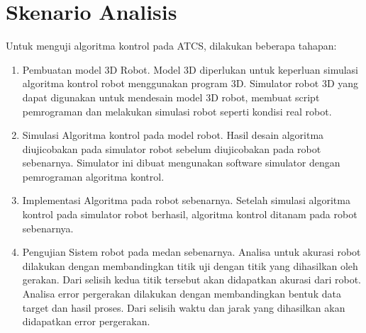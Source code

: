 \section{Skenario Analisis}

Untuk menguji algoritma kontrol pada ATCS, dilakukan beberapa tahapan:

\begin{enumerate}
	\item Pembuatan model 3D Robot. Model 3D diperlukan untuk keperluan simulasi algoritma kontrol robot menggunakan program 3D. Simulator robot 3D yang dapat digunakan untuk mendesain model 3D robot, membuat script pemrograman dan melakukan simulasi robot seperti kondisi real robot.

\item Simulasi Algoritma kontrol pada model robot. Hasil desain algoritma diujicobakan pada simulator robot sebelum diujicobakan pada robot sebenarnya. Simulator ini dibuat mengunakan software simulator dengan pemrograman algoritma kontrol.

\item Implementasi Algoritma pada robot sebenarnya. Setelah simulasi algoritma kontrol pada simulator robot berhasil, algoritma kontrol ditanam pada robot sebenarnya.
\item Pengujian Sistem robot pada medan sebenarnya. Analisa untuk akurasi robot dilakukan dengan membandingkan titik uji dengan titik yang dihasilkan oleh gerakan. Dari selisih kedua titik tersebut akan didapatkan akurasi dari robot.  Analisa error pergerakan dilakukan dengan membandingkan bentuk data target dan hasil proses. Dari selisih waktu dan jarak yang dihasilkan akan didapatkan error pergerakan.
\end{enumerate}